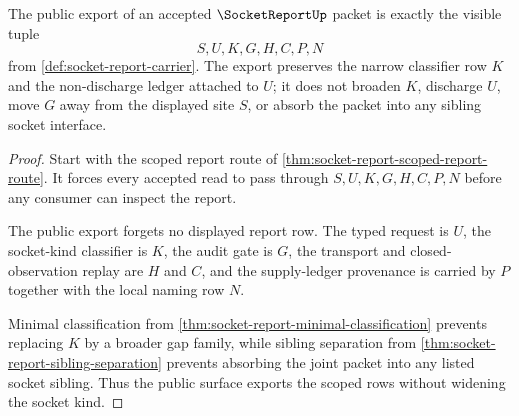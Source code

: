 \begin{theorem}
\label{thm:socket-report-public-export}
The public export of an accepted $\SocketReportUp$ packet is exactly the visible tuple
$$
S,U,K,G,H,C,P,N
$$
from \autoref{def:socket-report-carrier}. The export preserves the narrow classifier row $K$ and the non-discharge ledger attached to $U$; it does not broaden $K$, discharge $U$, move $G$ away from the displayed site $S$, or absorb the packet into any sibling socket interface.
\end{theorem}
\begin{proof}
Start with the scoped report route of \autoref{thm:socket-report-scoped-report-route}. It forces every accepted read to pass through $S,U,K,G,H,C,P,N$ before any consumer can inspect the report.

The public export forgets no displayed report row. The typed request is $U$, the socket-kind classifier is $K$, the audit gate is $G$, the transport and closed-observation replay are $H$ and $C$, and the supply-ledger provenance is carried by $P$ together with the local naming row $N$.

Minimal classification from \autoref{thm:socket-report-minimal-classification} prevents replacing $K$ by a broader gap family, while sibling separation from \autoref{thm:socket-report-sibling-separation} prevents absorbing the joint packet into any listed socket sibling. Thus the public surface exports the scoped rows without widening the socket kind.
\end{proof}



